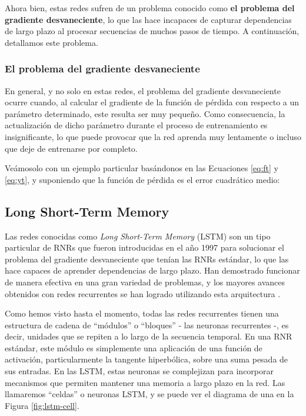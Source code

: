 \documentclass[../../main.tex]{subfiles}
\begin{document}
Ahora bien, estas redes sufren de un problema conocido como \textbf{el problema del
gradiente desvaneciente}, lo que las hace incapaces de capturar dependencias de largo
plazo al procesar secuencias de muchos pasos de tiempo. A continuación, detallamos
este problema.

\subsubsection{El problema del gradiente desvaneciente}
En general, y no solo en estas redes, el problema del gradiente desvaneciente ocurre
cuando, al calcular el gradiente de la función de pérdida con respecto a un parámetro
determinado, este resulta ser muy pequeño. Como consecuencia, la actualización de dicho
parámetro durante el proceso de entrenamiento es insignificante, lo que puede provocar que
la red aprenda muy lentamente o incluso que deje de entrenarse por completo.

Veámosolo con un ejemplo particular basándonos en las Ecuaciones \ref{eq:ft} y \ref{eq:yt},
y suponiendo que la función de pérdida es el error cuadrático medio:


\subsection{Long Short-Term Memory}
Las redes conocidas como \textit{Long Short-Term Memory} (LSTM) son un tipo particular de
RNRs que fueron introducidas en el año 1997 \cite{lstm-paper-1997} para solucionar el
problema del gradiente desvaneciente que tenían las RNRs estándar, lo que las hace capaces
de aprender dependencias de largo plazo. Han demostrado funcionar de manera efectiva en
una gran variedad de problemas, y los mayores avances obtenidos con redes recurrentes se
han logrado utilizando esta arquitectura \cite{colahs-blog-lstm-2015}.

Como hemos visto hasta el momento, todas las redes recurrentes tienen una estructura de
cadena de ``módulos'' o ``bloques'' \cite{colahs-blog-lstm-2015} - las neuronas
recurrentes -, es decir, unidades que se repiten a lo largo de la secuencia temporal. En
una RNR estándar, este módulo es simplemente una aplicación de una función de activación,
particularmente la tangente hiperbólica, sobre una suma pesada de sus entradas. En las
LSTM, estas neuronas se complejizan para incorporar mecanismos que permiten mantener
una memoria a largo plazo en la red. Las llamaremos ``celdas'' o neuronas LSTM, y se
puede ver el diagrama de una en la Figura \ref{fig:lstm-cell}.
\end{document}

